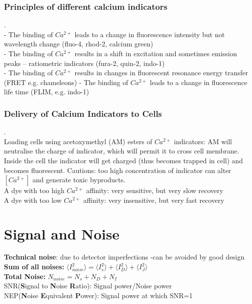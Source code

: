 \documentclass[9pt]{article}
\begin{document}
\begin{multicols}{2}
\subsubsection{Principles of different calcium indicators}.\\
- The binding of  $Ca^{2+}$ leads to a change in fluorescence intensity but not
wavelength change (fluo-4, rhod-2, calcium green)\\
- The binding of $Ca^{2+}$ results in a shift in excitation and sometimes emission
peaks – ratiometric indicators (fura-2, quin-2, indo-1)\\
- The binding of $Ca^{2+}$ results in changes in fluorescent resonance energy
transfer (FRET e.g. chameleons)
- The binding of $Ca^{2+}$ leads to a change in fluorescence life time (FLIM, e.g.
indo-1)
\subsubsection{Delivery of Calcium Indicators to Cells}.\\
Loading cells using acetoxymethyl (AM) esters of $Ca^{2+}$ indicators: AM will neutralise the charge of indicator, which will permit it to cross cell membrane. Inside the cell the indicator will get charged (thus becomes trapped in cell) and becomes fluorescent. Cautions: too high concentration of indicator can alter $[Ca^{2+}]$ and generate toxic byproducts.\\
A dye with too high $Ca^{2+}$ affinity: very sensitive, but very slow recovery\\
A dye with too low $Ca^{2+}$ affinity: very insensitive, but very fast recovery
\section{Signal and Noise}
\textbf{Technical noise}: due to detector imperfections -can be avoided by good design\\
\textbf{Sum of all noises:} $\langle I_{noise}^2 \rangle =\langle I_s^2\rangle + \langle I_D^2 \rangle + \langle I_J^2 \rangle$\\
\textbf{Total Noise:} $N_{noise}  = N_s+N_D+N_I$\\
	SNR(\textbf{S}ignal to \textbf{N}oise \textbf{R}atio): Signal power/Noise power\\
	NEP(\textbf{N}oise \textbf{E}quivalent \textbf{P}ower): Signal power at which SNR=1\\

\end{multicols}
\end{document}
